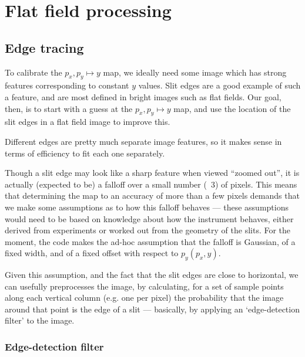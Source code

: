 \section{Flat field processing}

\subsection{Edge tracing}

To calibrate the $p_x, p_y \mapsto y$ map, we ideally need some image
which has strong features corresponding to constant $y$ values. Slit
edges are a good example of such a feature, and are most defined in
bright images such as flat fields. Our goal, then, is to start with a
guess at the $p_x, p_y \mapsto y$ map, and use the location of the slit
edges in a flat field image to improve this.

Different edges are pretty much separate image features, so it makes
sense in terms of efficiency to fit each one separately.

Though a slit edge may look like a sharp feature when viewed ``zoomed
out'', it is actually (expected to be) a falloff over a small number
(~3) of pixels. This means that determining the map to an accuracy
of more than a few pixels demands that we make some assumptions as
to how this falloff behaves --- these assumptions would need to be
based on knowledge about how the instrument behaves, either derived
from experiments or worked out from the geometry of the slits. For
the moment, the code makes the ad-hoc assumption that the falloff is
Gaussian, of a fixed width, and of a fixed offset with respect to
$p_y(p_x, y)$.

Given this assumption, and the fact that the slit edges are close to
horizontal, we can usefully preprocesses the image, by calculating,
for a set of sample points along each vertical column (e.g. one per pixel)
the probability that the image around that point is the edge of a slit
--- basically, by applying an `edge-detection filter' to the image.

\subsubsection{Edge-detection filter}

